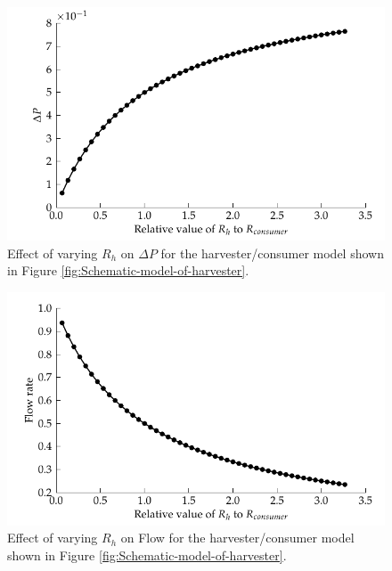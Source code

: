 \begin{figure} \begin{centering}
        \includegraphics{content/pt1/01-PowerHarvesting/graphics/streamingCell_consumerModel_dP}
        \par\end{centering}

\protect\caption{\label{fig:Effect-of-varying-Rh-onP}Effect of varying $R_{h}$
    on $\Delta P$ for the harvester/consumer model shown in Figure
    \ref{fig:Schematic-model-of-harvester}.}


\end{figure}


\begin{figure} \begin{centering}
        \includegraphics{content/pt1/01-PowerHarvesting/graphics/streamingCell_consumerModel_flow}
        \par\end{centering}

\protect\caption{\label{fig:Effect-of-varying-Rh-onFlow}Effect of varying
    $R_{h}$ on Flow for the harvester/consumer model shown in Figure
    \ref{fig:Schematic-model-of-harvester}.} \end{figure}


